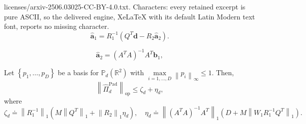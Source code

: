 \documentclass[10pt,a4paper]{amsart}
\renewcommand{\P}{\mathbb{P}} %
\begin{document}
licenses/arxiv-2506.03025-CC-BY-4.0.txt. Characters: every retained excerpt is pure ASCII, so the delivered engine, XeLaTeX with its default Latin Modern text font, reports no missing character.
\begin{equation}\label{a1eq}
\hat{\boldsymbol{a}}_1 = R_{1}^{-1} \left(Q^T\boldsymbol{d} - R_{2} \hat{\boldsymbol{a}}_2\right).    
\end{equation}

\begin{equation}\label{a2eq}
	\hat{\boldsymbol{a}}_2=\left(A^{T} A\right)^{-1}A^{T}\boldsymbol{b}_1,
\end{equation}

\begin{proposition} \label{Thm:EstimateOfNorm}
Let $ \left\{ p_1, \ldots, p_D \right\} $ be a basis for $ \P_d\left(\mathbb{R}^2\right) $ with $\underset{i=1,\dots,D}{\max} \left\lVert p_i \right\rVert_{\infty} \leq 1$. Then,
\begin{equation}
\label{eq:BoundThm}
    \left\lVert \hat{\Pi}_d^{\mathrm{Pad}} \right\rVert_{\mathrm{op}} \leq \zeta_d + \eta_d,
\end{equation}
where
\begin{equation*}
\zeta_d \doteq \left\lVert R_{1}^{-1} \right\rVert_{1} \left(M \left\lVert Q^{T} \right\rVert_{1} + \left\lVert R_{2}\right\rVert_{1}\eta_d\right), \quad     \eta_d \doteq \left\lVert(A^T A)^{-1} A^T \right\rVert_1\left(D + M \left\lVert  W_1 R_{1}^{-1}Q^T\right\rVert_1  \right).
\end{equation*}
\end{proposition}
\end{document}
